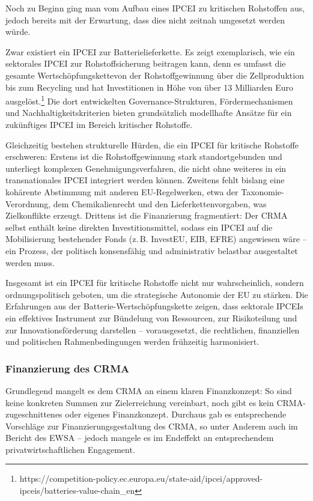 \documentclass[12pt,a4paper,oneside]{book} %
\begin{document}
Noch zu Beginn ging man vom Aufbau eines IPCEI zu kritischen Rohstoffen aus, jedoch bereits mit der Erwartung, dass dies nicht zeitnah umgesetzt werden würde.\autocite{Rohde_PWC}

Zwar existiert ein IPCEI zur Batterielieferkette. Es zeigt exemplarisch, wie ein sektorales IPCEI zur Rohstoffsicherung beitragen kann, denn es umfasst die gesamte Wertschöpfungskettevon der Rohstoffgewinnung über die Zellproduktion bis zum Recycling und hat Investitionen in Höhe von über 13 Milliarden Euro ausgelöst.\footnote{https://competition-policy.ec.europa.eu/state-aid/ipcei/approved-ipceis/batteries-value-chain_en} Die dort entwickelten Governance-Strukturen, Fördermechanismen und Nachhaltigkeitskriterien bieten grundsätzlich modellhafte Ansätze für ein zukünftiges IPCEI im Bereich kritischer Rohstoffe.

Gleichzeitig bestehen strukturelle Hürden, die ein IPCEI für kritische Rohstoffe erschweren: Erstens ist die Rohstoffgewinnung stark standortgebunden und unterliegt komplexen Genehmigungsverfahren, die nicht ohne weiteres in ein transnationales IPCEI integriert werden können. Zweitens fehlt bislang eine kohärente Abstimmung mit anderen EU-Regelwerken, etwa der Taxonomie-Verordnung, dem Chemikalienrecht und den Lieferkettenvorgaben, was Zielkonflikte erzeugt. Drittens ist die Finanzierung fragmentiert: Der CRMA selbst enthält keine direkten Investitionsmittel, sodass ein IPCEI auf die Mobilisierung bestehender Fonds (z. B. InvestEU, EIB, EFRE) angewiesen wäre – ein Prozess, der politisch konsensfähig und administrativ belastbar ausgestaltet werden muss.

Insgesamt ist ein IPCEI für kritische Rohstoffe nicht nur wahrscheinlich, sondern ordnungspolitisch geboten, um die strategische Autonomie der EU zu stärken. Die Erfahrungen aus der Batterie-Wertschöpfungskette zeigen, dass sektorale IPCEIs ein effektives Instrument zur Bündelung von Ressourcen, zur Risikoteilung und zur Innovationsförderung darstellen – vorausgesetzt, die rechtlichen, finanziellen und politischen Rahmenbedingungen werden frühzeitig harmonisiert.

\subsubsection{Finanzierung des CRMA}

Grundlegend mangelt es dem CRMA an einem klaren Finanzkonzept: So sind keine konkreten Summen zur Zielerreichung vereinbart, noch gibt es kein CRMA-zugeschnittenes oder eigenes Finanzkonzept. Durchaus gab es entsprechende Vorschläge zur Finanzierungsgestaltung des CRMA, so unter Anderem auch im Bericht des EWSA -- jedoch mangele es im Endeffekt an entsprechendem privatwirtschaftlichen Engagement.\autocite{Frenz 2025, S. 1101-1102}
\end{document}
